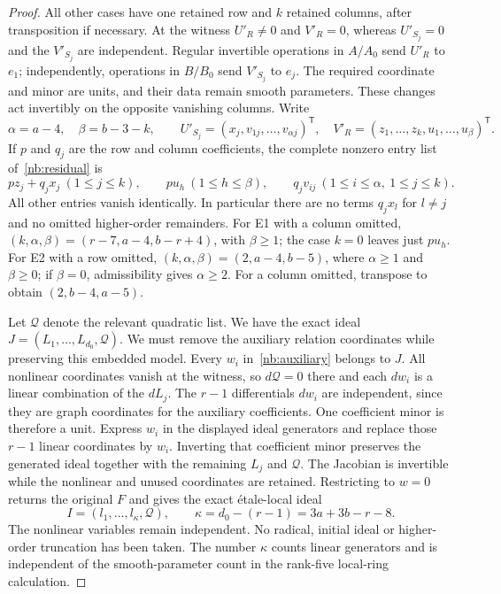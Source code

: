 \begin{proof}
All other cases have one retained row and $k$ retained columns,
after transposition if necessary. At the witness $U'_R\ne0$ and
$V'_R=0$, whereas $U'_{S_j}=0$ and the $V'_{S_j}$ are independent.
Regular invertible operations in $A/A_0$ send $U'_R$ to $e_1$;
independently, operations in $B/B_0$ send $V'_{S_j}$ to $e_j$.
The required coordinate and minor are units, and their data remain
smooth parameters. These changes act invertibly on the opposite
vanishing columns. Write
\[
 \alpha=a-4,\quad\beta=b-3-k,\qquad
 U'_{S_j}=(x_j,v_{1j},\ldots,v_{\alpha j})^{\mathsf T},\quad
 V'_R=(z_1,\ldots,z_k,u_1,\ldots,u_\beta)^{\mathsf T}.
\]
If $p$ and $q_j$ are the row and column coefficients, the complete
nonzero entry list of~\eqref{nb:residual} is
\begin{equation}\label{nb:star-residual}
 pz_j+q_jx_j\ (1\leq j\leq k),\qquad
 pu_h\ (1\leq h\leq\beta),\qquad
 q_jv_{ij}\ (1\leq i\leq\alpha,\ 1\leq j\leq k).
\end{equation}
All other entries vanish identically. In particular there are no
terms $q_jx_l$ for $l\ne j$ and no omitted higher-order remainders.
For E1 with a column omitted,
$(k,\alpha,\beta)=(r-7,a-4,b-r+4)$, with $\beta\geq1$;
the case $k=0$ leaves just $pu_h$. For E2 with a row omitted,
$(k,\alpha,\beta)=(2,a-4,b-5)$, where $\alpha\geq1$ and
$\beta\geq0$; if $\beta=0$, admissibility gives $\alpha\geq2$.
For a column omitted, transpose to obtain $(2,b-4,a-5)$.

Let $\mathcal Q$ denote the relevant quadratic list. We have the
exact ideal $J=(L_1,\ldots,L_{d_0},\mathcal Q)$. We must remove the
auxiliary relation coordinates while preserving this embedded model.
Every $w_i$ in~\eqref{nb:auxiliary} belongs to $J$. All nonlinear
coordinates vanish at the witness, so $d\mathcal Q=0$ there and each
$dw_i$ is a linear combination of the $dL_j$. The $r-1$ differentials
$dw_i$ are independent, since they are graph coordinates for the
auxiliary coefficients. One coefficient minor is therefore a unit.
Express $w_i$ in the displayed ideal generators and replace those
$r-1$ linear coordinates by $w_i$. Inverting that coefficient minor
preserves the generated ideal together with the remaining $L_j$ and
$\mathcal Q$. The Jacobian is invertible while the nonlinear and
unused coordinates are retained. Restricting to $w=0$ returns the
original $F$ and gives the exact \'etale-local ideal
\begin{equation}\label{nb:dependence-ideal}
 I=(l_1,\ldots,l_\kappa,\mathcal Q),\qquad
 \kappa=d_0-(r-1)=3a+3b-r-8.
\end{equation}
The nonlinear variables remain independent. No radical, initial
ideal or higher-order truncation has been taken. The number $\kappa$
counts linear generators and is independent of the smooth-parameter
count in the rank-five local-ring calculation.


\end{proof}
